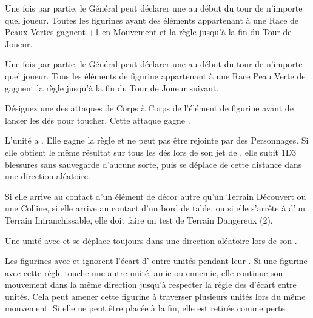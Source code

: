 \begin{multicols}{2}\raggedcolumns
\armyspecialruleentry{\waaargh}

Une fois par partie, le Général peut déclarer une \waaargh{} au début du tour de n'importe quel joueur. Toutes les figurines ayant des éléments appartenant à une Race de Peaux Vertes gagnent +1 en Mouvement et la règle \swiftstride{} jusqu'à la fin du Tour de Joueur.

\columnbreak
\armyspecialruleentry{\greentide}

Une fois par partie, le Général peut déclarer une \greentide{} au début du tour de n'importe quel joueur. Tous les éléments de figurine appartenant à une Race Peau Verte de \goblins{} gagnent la règle \fightinextrarank{} jusqu'à la fin du Tour de Joueur suivant.

\end{multicols}

\armyspecialruleentry{\venomousfangs}

Désignez une des attaques de Corps à Corps de l'élément de figurine avant de lancer les dés pour toucher. Cette attaque gagne \multiplewounds{\ordnance}{}.


L'unité a . Elle gagne la règle \immunetopsychology{} et ne peut pas être rejointe par des Personnages. Si elle obtient le même résultat sur tous les dés lors de son jet de \randommovement{}, elle subit 1D3 blessures sans sauvegarde d'aucune sorte, puis se déplace de cette distance dans une direction aléatoire.

Si elle arrive au contact d'un élément de décor autre qu'un Terrain Découvert ou une Colline, si elle arrive au contact d'un bord de table, ou si elle s'arrête à  d'un Terrain Infranchissable, elle doit faire un test de Terrain Dangereux (2).

\armyspecialruleentry{\runningamok}

Une unité avec \shambolic{} et \runningamok{} se déplace toujours dans une direction aléatoire lors de son \randommovement{}.


Les figurines avec \shambolic{} et \ricochet{} ignorent l'écart d' entre unités pendant leur \randommovement{}. Si une figurine avec cette règle touche une autre unité, amie ou ennemie, elle continue son mouvement dans la même direction jusqu'à respecter la règle des  d'écart entre unités. Cela peut amener cette figurine à traverser plusieurs unités lors du même mouvement. Si elle ne peut être placée à la fin, elle est retirée comme perte.

